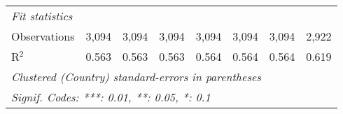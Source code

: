 \begin{tabular}{lccccccc}
   \midrule \emph{Fit statistics}\\
   Observations                                                              & 3,094        & 3,094        & 3,094        & 3,094        & 3,094        & 3,094        & 2,922\\  
   R$^2$                                                                     & 0.563        & 0.563        & 0.563        & 0.564        & 0.564        & 0.564        & 0.619\\  
   \midrule
   \multicolumn{8}{l}{\emph{Clustered (Country) standard-errors in parentheses}}\\
   \multicolumn{8}{l}{\emph{Signif. Codes: ***: 0.01, **: 0.05, *: 0.1}}\\
\end{tabular}
\par\endgroup


